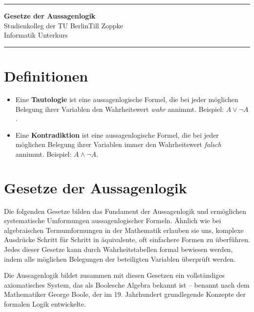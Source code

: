 \documentclass[ngerman,11pt]{article}
\date{\DTMgermanmonthname{\month} \the\year}
\begin{document}
\hrule
\begin{center}
{\large\bf Gesetze der Aussagenlogik}\\[-0mm]
Studienkolleg der TU Berlin\hfill Till Zoppke\\
\makeatletter Informatik Unterkurs \hfill \@date\\[2mm] \makeatother
\end{center}
\hrule

\section*{Definitionen}
\begin{itemize}
\item Eine \textbf{Tautologie} ist eine aussagenlogische Formel, die bei jeder möglichen Belegung ihrer Variablen den Wahrheitswert \textit{wahr} annimmt. Beispiel: $A \vee \neg A$.
\item Eine \textbf{Kontradiktion} ist eine aussagenlogische Formel, die bei jeder möglichen Belegung ihrer Variablen immer den Wahrheitswert \textit{falsch} annimmt. Beispiel: $A \wedge \neg A$.
\end{itemize}

\section*{Gesetze der Aussagenlogik}

Die folgenden Gesetze bilden das Fundament der Aussagenlogik und ermöglichen systematische Umformungen aussagenlogischer Formeln. Ähnlich wie bei algebraischen Termumformungen in der Mathematik erlauben sie uns, komplexe Ausdrücke Schritt für Schritt in äquivalente, oft einfachere Formen zu überführen. Jedes dieser Gesetze kann durch Wahrheitstabellen formal bewiesen werden, indem alle möglichen Belegungen der beteiligten Variablen überprüft werden.

Die Aussagenlogik bildet zusammen mit diesen Gesetzen ein vollständiges axiomatisches System, das als Boolesche Algebra bekannt ist – benannt nach dem Mathematiker George Boole, der im 19. Jahrhundert grundlegende Konzepte der formalen Logik entwickelte.
\end{document}
